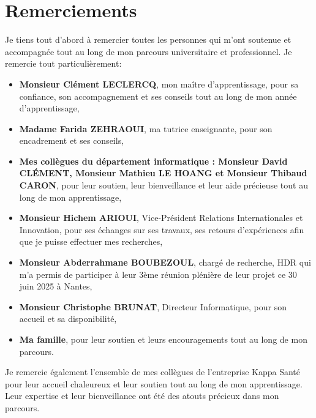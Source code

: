 \section{Remerciements}
Je tiens tout d'abord à remercier toutes les personnes qui m'ont soutenue et accompagnée tout au long de mon parcours universitaire et professionnel. 
Je remercie tout particulièrement: \
\begin{itemize}
    \item \textbf{Monsieur Clément LECLERCQ}, mon maître d'apprentissage, pour sa confiance, son accompagnement et ses conseils tout au long de mon année d'apprentissage,
    \item \textbf{Madame Farida ZEHRAOUI}, ma tutrice enseignante, pour son encadrement et ses conseils,
     \item \textbf{Mes collègues du département informatique : Monsieur David CLÉMENT, Monsieur Mathieu LE HOANG et Monsieur Thibaud CARON}, pour leur soutien, leur bienveillance et leur aide précieuse tout au long de mon apprentissage,
    \item \textbf{Monsieur Hichem ARIOUI}, Vice-Président Relations Internationales et Innovation, pour ses échanges sur ses travaux, ses retours d'expériences afin que je puisse effectuer mes recherches,
    \item \textbf{Monsieur Abderrahmane BOUBEZOUL}, chargé de recherche, HDR qui m'a permis de participer à leur 3ème réunion plénière de leur projet ce 30 juin 2025 à Nantes,
    \item \textbf{Monsieur Christophe BRUNAT}, Directeur Informatique, pour son accueil et sa disponibilité,
    \item \textbf{Ma famille}, pour leur soutien et leurs encouragements tout au long de mon parcours.
\end{itemize}
\vspace{0.5cm}
Je remercie également l'ensemble de mes collègues de l'entreprise Kappa Santé pour leur accueil chaleureux et leur soutien tout au long de mon apprentissage. Leur expertise et leur bienveillance ont été des atouts précieux dans mon parcours.